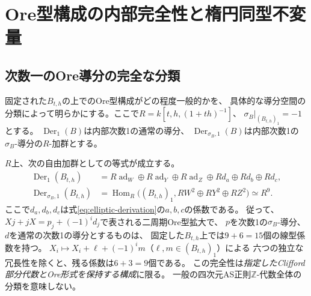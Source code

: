 \section{Ore型構成の内部完全性と楕円同型不変量}\label{sec:ore-complete}
\subsection{次数一のOre導分の完全な分類}\label{subsec:ore-derivations}
固定された$B_{t,h}$の上でのOre型構成がどの程度一般的かを、
具体的な導分空間の分類によって明らかにする。ここで$R=k[t,h,(1+th)^{-1}]$、
$\sigma_B|_{(B_{t,h})_1}=-1$とする。
$\operatorname{Der}_1(B)$は内部次数1の通常の導分、
$\operatorname{Der}_{\sigma_B,1}(B)$は内部次数1の$\sigma_B$-導分の$R$-加群とする。

\begin{theorem}[固定Clifford部分のOre導分の全分類]\label{thm:ore-derivations}
$R$上、次の自由加群としての等式が成立する。
\begin{align}
 \operatorname{Der}_1(B_{t,h})
 &=R\operatorname{ad}_W\oplus R\operatorname{ad}_Y\oplus R\operatorname{ad}_Z
   \oplus Rd_a\oplus Rd_b\oplus Rd_c,\label{eq:ordinary-derivations}\\
 \operatorname{Der}_{\sigma_B,1}(B_{t,h})
 &=\operatorname{Hom}_R\bigl((B_{t,h})_1,
       RW^2\oplus RY^2\oplus RZ^2\bigr)\simeq R^9.
       \label{eq:sign-derivations}
\end{align}
ここで$d_a,d_b,d_c$は式\eqref{eq:elliptic-derivation}の$a,b,c$の係数である。
従って、$Xj+jX=p_j+(-1)^i d_j$で表される二周期Ore型拡大で、
$p$を次数1の$\sigma_B$-導分、$d$を通常の次数1の導分とするものは、
固定した$B_{t,h}$上では$9+6=15$個の線型係数を持つ。
$X_i\mapsto X_i+\ell+(-1)^i m$（$\ell,m\in(B_{t,h})_1$）による
六つの独立な冗長性を除くと、残る係数は$6+3=9$個である。
この完全性は\emph{指定したClifford部分代数とOre形式を保持する構成}に限る。
一般の四次元AS正則$\mathbb Z$-代数全体の分類を意味しない。
\end{theorem}
